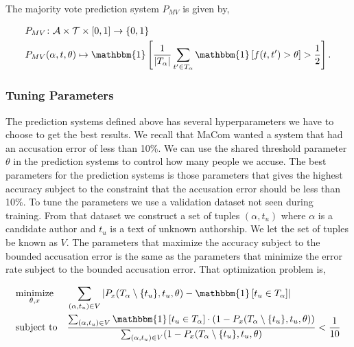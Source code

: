 \begin{definition}
    \label{def:majority_vote_prediction_system}

    The majority vote prediction system $P_{MV}$ is given by,

    \begin{align}
        &P_{MV} \colon \mathcal{A} \times \mathcal{T} \times [0, 1] \rightarrow
            \{0, 1\} \\
        &P_{MV}(\alpha, t, \theta) \mapsto \mathbbm{1}\left[
                \frac{1}{|T_\alpha|} \sum_{t' \in T_\alpha} \mathbbm{1}\left[
                    f(t, t') > \theta
                \right] > \frac{1}{2}
            \right].
    \end{align}

\end{definition}


\subsubsection{Tuning Parameters}
\label{subsubsec:tuning_parameters}

The prediction systems defined above has several hyperparameters we have to
choose to get the best results. We recall that MaCom wanted a system that had an
accusation error of less than 10\%. We can use the shared threshold parameter
$\theta$ in the prediction systems to control how many people we accuse. The
best parameters for the prediction systems is those parameters that gives the
highest accuracy subject to the constraint that the accusation error should be
less than 10\%. To tune the parameters we use a validation dataset not seen
during training. From that dataset we construct a set of tuples $(\alpha, t_u)$
where $\alpha$ is a candidate author and $t_u$ is a text of unknown authorship.
We let the set of tuples be known as $V$. The parameters that maximize the
accuracy subject to the bounded accusation error is the same as the parameters
that minimize the error rate subject to the bounded accusation error. That
optimization problem is,

\begin{equation}
    \label{eq:prediction_system_minimization}
    \begin{aligned}
        & \underset{\theta, x}{\text{minimize}}
        & & \sum_{(\alpha, t_u) \in V} \left|
            P_x(T_\alpha \setminus \{t_u\}, t_u, \theta) -
            \mathbbm{1}\left[t_u \in T_\alpha\right]
        \right| \\
        & \text{subject to}
        & & \frac{\sum_{(\alpha, t_u) \in V} \mathbbm{1}\left[t_u \in T_\alpha\right] \cdot
            \left(1 - P_x(T_\alpha \setminus \{t_u\}, t_u, \theta)\right)}
{\sum_{(\alpha, t_u) \in V} (1 - P_x(T_\alpha \setminus \{t_u\}, t_u, \theta)} <
            \frac{1}{10}
    \end{aligned}
\end{equation}

